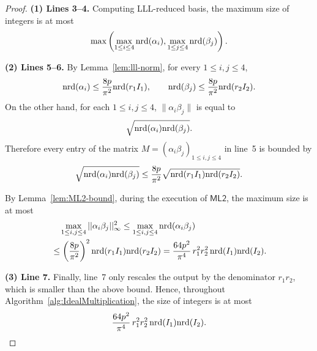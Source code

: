 \begin{proof}
\noindent\textbf{(1) Lines 3--4.}
Computing LLL-reduced basis, the maximum size of integers is at most
\[\max\left( \max_{1\le i\le4}\mathrm{nrd}(\alpha_i), \max_{1\le j\le4}\mathrm{nrd}(\beta_j) \right).\]

\smallskip
\noindent\textbf{(2) Lines 5--6.}
By Lemma~\ref{lem:lll-norm}, for every $1\le i,j\le 4$,
\[
\mathrm{nrd}(\alpha_i)\le \frac{8p}{\pi^2}\mathrm{nrd}(r_1I_1),
\qquad
\mathrm{nrd}(\beta_j)\le \frac{8p}{\pi^2}\mathrm{nrd}(r_2I_2).
\]
On the other hand, for each $1\le i,j\le4$, $\| \alpha_i\beta_j \|$ is equal to
\[
\sqrt{\mathrm{nrd}(\alpha_i)\mathrm{nrd}(\beta_j)}.
\]
Therefore every entry of the matrix $M=(\alpha_i\beta_j)_{1\le i,j\le 4}$ in
line~5 is bounded by
\[
\sqrt{\mathrm{nrd}(\alpha_i)\mathrm{nrd}(\beta_j)}
\le
\frac{8p}{\pi^2}\sqrt{\mathrm{nrd}(r_1I_1)\mathrm{nrd}(r_2I_2)}.
\]

By Lemma~\ref{lem:ML2-bound}, during the execution of $\mathsf{ML2}$, the maximum size is at most
\[\begin{aligned}
&\quad\max_{1\le i,j\le4}||\alpha_i\beta_j||_\infty^2
\le \max_{1\le i,j\le4}\mathrm{nrd}(\alpha_i\beta_j)\\
&\le \left(\frac{8p}{\pi^2}\right)^2\mathrm{nrd}(r_1I_1)\mathrm{nrd}(r_2I_2)
= \frac{64p^2}{\pi^4}\,r_1^2r_2^2\,\mathrm{nrd}(I_1)\mathrm{nrd}(I_2).
\end{aligned}\]

\smallskip
\noindent\textbf{(3) Line 7.}
Finally, line~7 only rescales the output by the
denominator $r_1r_2$, which is smaller than the above bound. Hence, throughout
Algorithm~\ref{alg:IdealMultiplication}, the size of integers is at most
\[
\frac{64p^2}{\pi^4}\,r_1^2r_2^2\,\mathrm{nrd}(I_1)\mathrm{nrd}(I_2).
\]
\end{proof}

